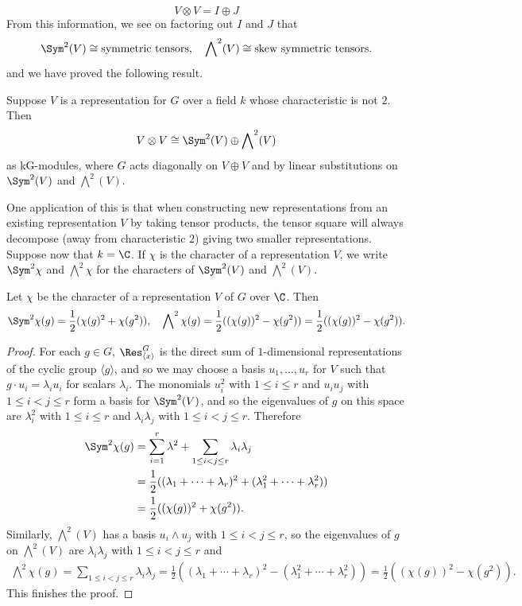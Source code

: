 \[V\otimes V=I\oplus J\]
From this information, we see on factoring out $I$ and $J$ that
\[\Sym^2(V)\cong\text{symmetric tensors},\quad\bigwedge\nolimits^2(V)\cong\text{skew symmetric tensors}.\]
and we have proved the following result.
\begin{proposition}
Suppose $V$ is a representation for $G$ over a field $k$ whose characteristic is not $2$. Then
\[V\otimes V\cong\Sym^2(V)\oplus\bigwedge\nolimits^2(V)\]
as kG-modules, where $G$ acts diagonally on $V\oplus V$ and by linear substitutions on $\Sym^2(V)$ and $\bigwedge^2(V)$.
\end{proposition}
One application of this is that when constructing new representations from an existing representation $V$ by taking tensor products, the tensor square will always decompose (away from characteristic $2$) giving two smaller representations. Suppose now that $k=\C$. If $\chi$ is the character of a representation $V$, we write $\Sym^2\chi$ and $\bigwedge^2\chi$ for the characters of $\Sym^2(V)$ and $\bigwedge^2(V)$.
\begin{proposition}
Let $\chi$ be the character of a representation $V$ of $G$ over $\C$. Then
\[\Sym^2\chi(g)=\frac{1}{2}(\chi(g)^2+\chi(g^2)),\quad\bigwedge\nolimits^2\chi(g)=\frac{1}{2}((\chi(g))^2-\chi(g^2))=\frac{1}{2}((\chi(g))^2-\chi(g^2)).\]
\end{proposition}
\begin{proof}
For each $g\in G$, $\Res^G_{\langle x\rangle}$ is the direct sum of $1$-dimensional representations of the cyclic group $\langle g\rangle$, and so we may choose a basis $u_1,\dots,u_r$ for $V$ such that $g\cdot u_i=\lambda_iu_i$ for scalars $\lambda_i$. The monomials $u_i^2$ with $1\leq i\leq r$ and $u_iu_j$ with $1\leq i<j\leq r$ form a basis for $\Sym^2(V)$, and so the eigenvalues of $g$ on this space are $\lambda_i^2$ with $1\leq i\leq r$ and $\lambda_i\lambda_j$ with $1\leq i<j\leq r$. Therefore
\begin{align*}
\Sym^2\chi(g)&=\sum_{i=1}^{r}\lambda^2+\sum_{1\leq i<j\leq r}\lambda_i\lambda_j\\
&=\frac{1}{2}((\lambda_1+\cdots+\lambda_r)^2+(\lambda_1^2+\cdots+\lambda_r^2))\\
&=\frac{1}{2}((\chi(g))^2+\chi(g^2)).
\end{align*}
Similarly, $\bigwedge^2(V)$ has a basis $u_i\wedge u_j$ with $1\leq i<j\leq r$, so the eigenvalues of $g$ on $\bigwedge^2(V)$ are $\lambda_i\lambda_j$ with $1\leq i<j\leq r$ and
\begin{align*}
\bigwedge\nolimits^2\chi(g)=\sum_{1\leq i<j\leq r}\lambda_i\lambda_j=\frac{1}{2}((\lambda_1+\cdots+\lambda_r)^2-(\lambda_1^2+\cdots+\lambda_r^2))=\frac{1}{2}((\chi(g))^2-\chi(g^2)).
\end{align*}
This finishes the proof.
\end{proof}

